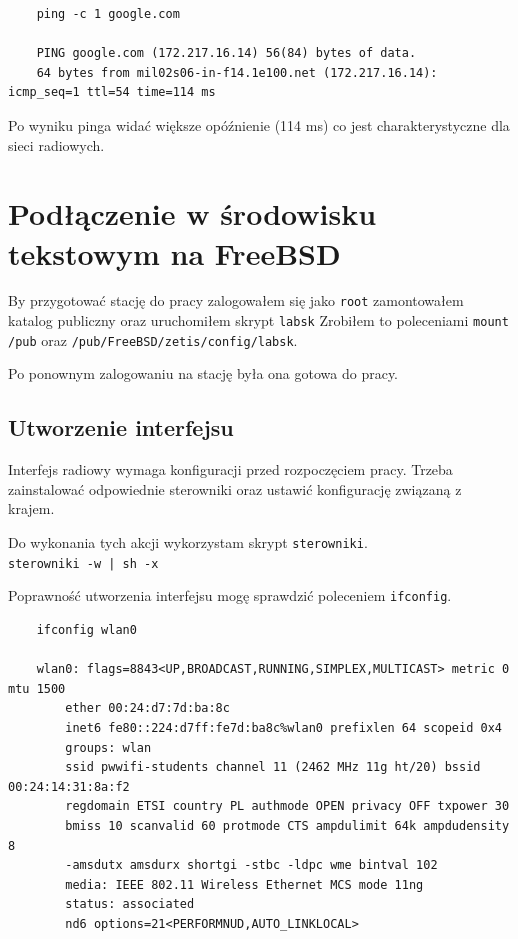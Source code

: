 \documentclass{article} %
\begin{document}
\begin{lstlisting}
    ping -c 1 google.com

    PING google.com (172.217.16.14) 56(84) bytes of data. 
    64 bytes from mil02s06-in-f14.1e100.net (172.217.16.14): icmp_seq=1 ttl=54 time=114 ms 
\end{lstlisting}
Po wyniku pinga widać większe opóźnienie (114 ms) co jest charakterystyczne dla sieci radiowych.

\section{Podłączenie w środowisku tekstowym na FreeBSD}
By przygotować stację do pracy zalogowałem się jako \texttt{root} zamontowałem katalog publiczny oraz uruchomiłem skrypt \texttt{labsk}
Zrobiłem to poleceniami \texttt{mount /pub} oraz \texttt{/pub/FreeBSD/zetis/config/labsk}.

Po ponownym zalogowaniu na stację była ona gotowa do pracy.

\subsection{Utworzenie interfejsu}
Interfejs radiowy wymaga konfiguracji przed rozpoczęciem pracy. Trzeba zainstalować odpowiednie sterowniki oraz ustawić konfigurację związaną z krajem.

Do wykonania tych akcji wykorzystam skrypt \texttt{sterowniki}. \\
\texttt{sterowniki -w | sh -x}
\vspace{3 mm}

Poprawność utworzenia interfejsu mogę sprawdzić poleceniem \texttt{ifconfig}.
\begin{lstlisting}
    ifconfig wlan0

    wlan0: flags=8843<UP,BROADCAST,RUNNING,SIMPLEX,MULTICAST> metric 0 mtu 1500
        ether 00:24:d7:7d:ba:8c
        inet6 fe80::224:d7ff:fe7d:ba8c%wlan0 prefixlen 64 scopeid 0x4
        groups: wlan
        ssid pwwifi-students channel 11 (2462 MHz 11g ht/20) bssid 00:24:14:31:8a:f2
        regdomain ETSI country PL authmode OPEN privacy OFF txpower 30
        bmiss 10 scanvalid 60 protmode CTS ampdulimit 64k ampdudensity 8
        -amsdutx amsdurx shortgi -stbc -ldpc wme bintval 102
        media: IEEE 802.11 Wireless Ethernet MCS mode 11ng
        status: associated
        nd6 options=21<PERFORMNUD,AUTO_LINKLOCAL>
\end{lstlisting}
\end{document}
